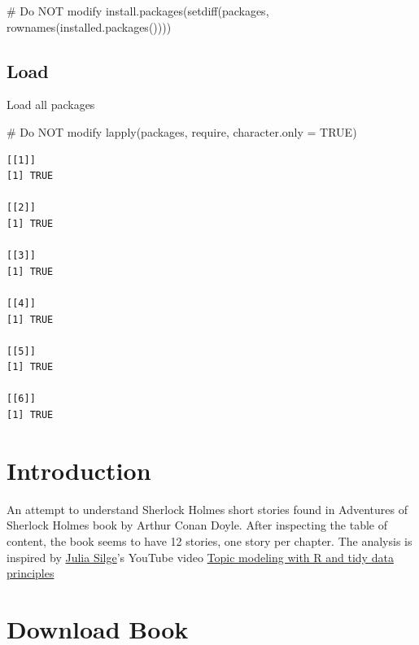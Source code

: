 \documentclass[
  letterpaper,
  DIV=11,
  numbers=noendperiod]{scrreprt}
\newenvironment{Shaded}{\begin{snugshade}}{\end{snugshade}}
\newcommand{\AttributeTok}[1]{\textcolor[rgb]{0.40,0.45,0.13}{#1}}
\newcommand{\CommentTok}[1]{\textcolor[rgb]{0.37,0.37,0.37}{#1}}
\newcommand{\ConstantTok}[1]{\textcolor[rgb]{0.56,0.35,0.01}{#1}}
\newcommand{\FunctionTok}[1]{\textcolor[rgb]{0.28,0.35,0.67}{#1}}
\newcommand{\NormalTok}[1]{\textcolor[rgb]{0.00,0.23,0.31}{#1}}
\begin{document}
\begin{Shaded}
\begin{Highlighting}[]
\CommentTok{\# Do NOT modify}
\FunctionTok{install.packages}\NormalTok{(}\FunctionTok{setdiff}\NormalTok{(packages, }\FunctionTok{rownames}\NormalTok{(}\FunctionTok{installed.packages}\NormalTok{())))}
\end{Highlighting}
\end{Shaded}

\subsection*{Load}\label{load-9}

Load all packages

\begin{Shaded}
\begin{Highlighting}[]
\CommentTok{\# Do NOT modify}
\FunctionTok{lapply}\NormalTok{(packages, require, }\AttributeTok{character.only =} \ConstantTok{TRUE}\NormalTok{)}
\end{Highlighting}
\end{Shaded}

\begin{verbatim}
[[1]]
[1] TRUE

[[2]]
[1] TRUE

[[3]]
[1] TRUE

[[4]]
[1] TRUE

[[5]]
[1] TRUE

[[6]]
[1] TRUE
\end{verbatim}

\section{Introduction}\label{introduction-7}

An attempt to understand Sherlock Holmes short stories found in
Adventures of Sherlock Holmes book by Arthur Conan Doyle. After
inspecting the table of content, the book seems to have 12 stories, one
story per chapter. The analysis is inspired by
\href{https://juliasilge.com/}{Julia Silge}'s YouTube video
\href{https://www.youtube.com/embed/evTuL-RcRpc}{Topic modeling with R
and tidy data principles}

\section{Download Book}\label{download-book}
\end{document}

